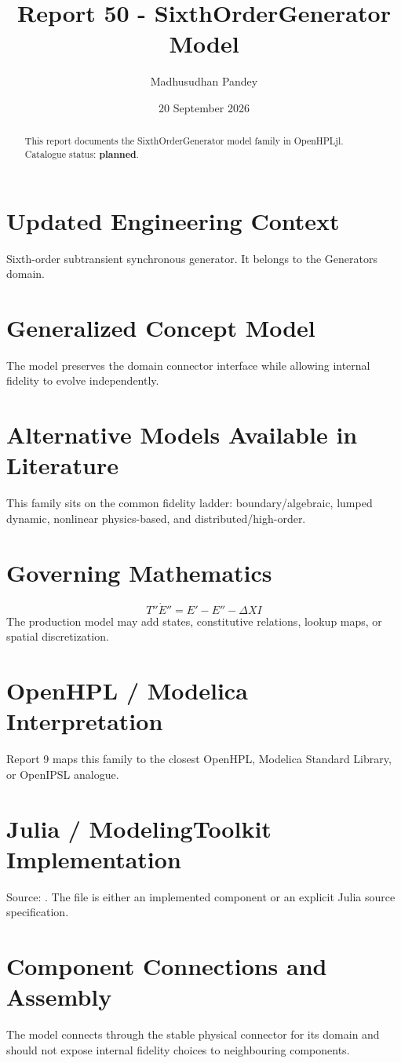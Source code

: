 \documentclass[10pt,a4paper]{article}
\title{Report 50 - SixthOrderGenerator Model}
\author{Madhusudhan Pandey}
\date{20 September 2026}
\begin{document}
\maketitle
\begin{abstract}This report documents the SixthOrderGenerator model family in OpenHPLjl. Catalogue status: \textbf{planned}.\end{abstract}
\section{Updated Engineering Context}Sixth-order subtransient synchronous generator. It belongs to the Generators domain.
\section{Generalized Concept Model}The model preserves the domain connector interface while allowing internal fidelity to evolve independently.
\section{Alternative Models Available in Literature}This family sits on the common fidelity ladder: boundary/algebraic, lumped dynamic, nonlinear physics-based, and distributed/high-order.
\section{Governing Mathematics}\[T''\dot E''=E'-E''-\Delta X I\]The production model may add states, constitutive relations, lookup maps, or spatial discretization.
\section{OpenHPL / Modelica Interpretation}Report 9 maps this family to the closest OpenHPL, Modelica Standard Library, or OpenIPSL analogue.
\section{Julia / ModelingToolkit Implementation}Source: \texttt{}. The file is either an implemented component or an explicit Julia source specification.
\section{Component Connections and Assembly}The model connects through the stable physical connector for its domain and should not expose internal fidelity choices to neighbouring components.
\end{document}
